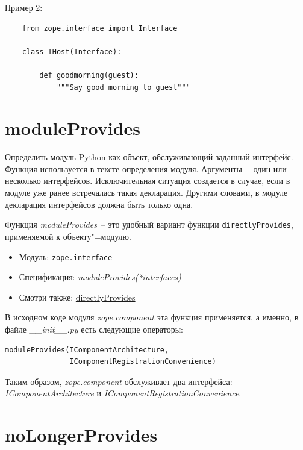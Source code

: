 \documentclass[a4paper,openany,twoside,final]{book}
\providecommand*{\DUroletitlereference}[1]{\textsl{#1}}
\begin{document}
Пример 2:

\begin{verbatim}
    from zope.interface import Interface

    class IHost(Interface):

        def goodmorning(guest):
            """Say good morning to guest"""
\end{verbatim}


\section*{moduleProvides%
  \label{moduleprovides}%
}

Определить модуль Python как объект, обслуживающий заданный интерфейс.  Функция используется в тексте определения модуля.  Аргументы~-- один или несколько интерфейсов.  Исключительная ситуация создается в случае, если в модуле уже ранее встречалась такая декларация.  Другими словами, в модуле декларация интерфейсов должна быть только одна.

Функция \DUroletitlereference{moduleProvides}~-- это удобный вариант функции \texttt{directlyProvides}, применяемой к объекту"=модулю.

\begin{itemize}

\item Модуль: \texttt{zope.interface}

\item Спецификация: \DUroletitlereference{moduleProvides(*interfaces)}

\item Смотри также: \hyperref[directlyprovides]{directlyProvides}

\end{itemize}

В исходном коде модуля \DUroletitlereference{zope.component} эта функция применяется, а именно, в файле \DUroletitlereference{\_\_init\_\_.py} есть следующие операторы:

\begin{verbatim}
moduleProvides(IComponentArchitecture,
               IComponentRegistrationConvenience)
\end{verbatim}

Таким образом, \DUroletitlereference{zope.component} обслуживает два интерфейса: \DUroletitlereference{IComponentArchitecture} и \DUroletitlereference{IComponentRegistrationConvenience}.


\section*{noLongerProvides%
  \label{nolongerprovides}%
}
\end{document}
